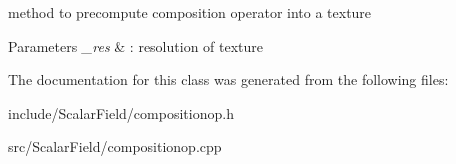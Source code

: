 method to precompute composition operator into a texture 


\begin{DoxyParams}{Parameters}
{\em \+\_\+res} & \+: resolution of texture \\
\hline
\end{DoxyParams}


The documentation for this class was generated from the following files\+:\begin{DoxyCompactItemize}
\item 
include/\+Scalar\+Field/compositionop.\+h\item 
src/\+Scalar\+Field/compositionop.\+cpp\end{DoxyCompactItemize}
